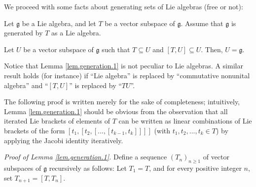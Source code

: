 \documentclass[etingof-lie.tex]{subfiles}
\begin{document}
We proceed with some facts about generating sets of Lie algebras (free or not):

\begin{lemma}
\label{lem.generation.1}Let $\mathfrak{g}$ be a Lie algebra, and let $T$ be a
vector subspace of $\mathfrak{g}$. Assume that $\mathfrak{g}$ is generated by
$T$ as a Lie algebra.

Let $U$ be a vector subspace of $\mathfrak{g}$ such that $T\subseteq U$ and
$\left[  T,U\right]  \subseteq U$. Then, $U=\mathfrak{g}$.
\end{lemma}

Notice that Lemma \ref{lem.generation.1} is not peculiar to Lie algebras. A
similar result holds (for instance) if ``Lie algebra'' is replaced by
``commutative nonunital algebra'' and ``$\left[  T,U\right]  $'' is replaced
by ``$TU$''.

The following proof is written merely for the sake of completeness;
intuitively, Lemma \ref{lem.generation.1} should be obvious from the
observation that all iterated Lie brackets of elements of $T$ can be written
as linear combinations of Lie brackets of the form $\left[  t_{1},\left[
t_{2},\left[  ...,\left[  t_{k-1},t_{k}\right]  \right]  \right]  \right]  $
(with $t_{1},t_{2},...,t_{k}\in T$) by applying the Jacobi identity iteratively.

\textit{Proof of Lemma \ref{lem.generation.1}.} Define a sequence $\left(
T_{n}\right)  _{n\geq1}$ of vector subspaces of $\mathfrak{g}$ recursively as
follows: Let $T_{1}=T$, and for every positive integer $n$, set $T_{n+1}%
=\left[  T,T_{n}\right]  $.
\end{document}
